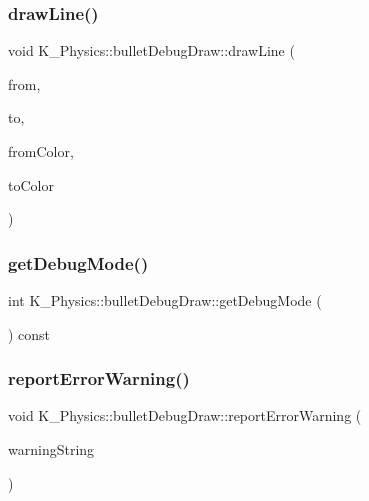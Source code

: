 \subsubsection{\texorpdfstring{draw\+Line()}{drawLine()}\hspace{0.1cm}{\footnotesize\ttfamily [2/2]}}
{\footnotesize\ttfamily void K\+\_\+\+Physics\+::bullet\+Debug\+Draw\+::draw\+Line (\begin{DoxyParamCaption}\item[{const bt\+Vector3 \&}]{from,  }\item[{const bt\+Vector3 \&}]{to,  }\item[{const bt\+Vector3 \&}]{from\+Color,  }\item[{const bt\+Vector3 \&}]{to\+Color }\end{DoxyParamCaption})}

\mbox{\label{class_k___physics_1_1bullet_debug_draw_aafca54d1beeece0bcaaf3da4765e7699}} 
\subsubsection{\texorpdfstring{get\+Debug\+Mode()}{getDebugMode()}}
{\footnotesize\ttfamily int K\+\_\+\+Physics\+::bullet\+Debug\+Draw\+::get\+Debug\+Mode (\begin{DoxyParamCaption}{ }\end{DoxyParamCaption}) const}

\mbox{\label{class_k___physics_1_1bullet_debug_draw_aa421c8d4afa407e1e8c9784fce42115e}} 
\subsubsection{\texorpdfstring{report\+Error\+Warning()}{reportErrorWarning()}}
{\footnotesize\ttfamily void K\+\_\+\+Physics\+::bullet\+Debug\+Draw\+::report\+Error\+Warning (\begin{DoxyParamCaption}\item[{const char $\ast$}]{warning\+String }\end{DoxyParamCaption})}

